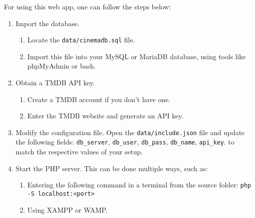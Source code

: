 \documentclass[a4paper]{article}
\begin{document}
For using this web app, one can follow the steps below:
\begin{enumerate}
    \item Import the database.
    \begin{enumerate}[label=$\rightarrow$]
        \item Locate the \texttt{data/cinemadb.sql} file.
        \item Import this file into your MySQL or MariaDB database, using tools like phpMyAdmin or bash.
    \end{enumerate}
    \item Obtain a TMDB API key.
    \begin{enumerate}[label=$\rightarrow$]
        \item Create a TMDB account if you don't have one.
        \item Enter the TMDB website and generate an API key.
    \end{enumerate}
    \item Modify the configuration file. Open the \texttt{data/include.json} file and update the following fields: \texttt{db\_server}, \texttt{db\_user}, \texttt{db\_pass}, \texttt{db\_name}, \texttt{api\_key}. to match the respective values of your setup.
    \item Start the PHP server. This can be done multiple ways, such as:
    \begin{enumerate}[label=$\rightarrow$]
        \item Entering the following command in a terminal from the source folder: \texttt{php -S localhost:<port>}
        \item Using XAMPP or WAMP.
    \end{enumerate}
\end{enumerate}
\end{document}
